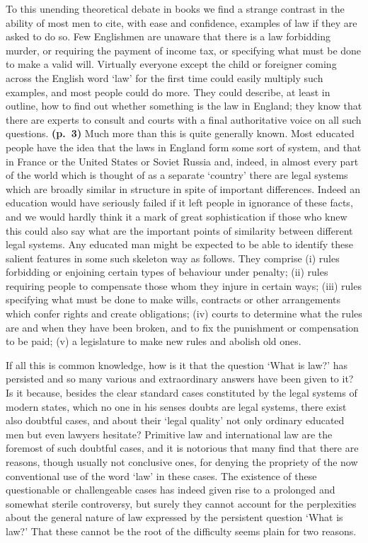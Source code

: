 \documentclass[12pt,oneside]{book}  %
\begin{document}
To this unending theoretical debate in books we find a strange contrast
in the ability of most men to cite, with ease and confidence, examples
of law if they are asked to do so. Few Englishmen are unaware that there
is a law forbidding murder, or requiring the payment of income tax, or
specifying what must be done to make a valid will. Virtually everyone
except the child or foreigner coming across the English word `law' for
the first time could easily multiply such examples, and most people
could do more. They could describe, at least in outline, how to find out
whether something is the law in England; they know that there are
experts to consult and courts with a final authoritative voice on all
such questions. \textbf{(p.~3)} Much more than this is quite generally
known. Most educated people have the idea that the laws in England form
some sort of system, and that in France or the United States or Soviet
Russia and, indeed, in almost every part of the world which is thought
of as a separate `country' there are legal systems which are broadly
similar in structure in spite of important differences. Indeed an
education would have seriously failed if it left people in ignorance of
these facts, and we would hardly think it a mark of great sophistication
if those who knew this could also say what are the important points of
similarity between different legal systems. Any educated man might be
expected to be able to identify these salient features in some such
skeleton way as follows. They comprise (i) rules forbidding or enjoining
certain types of behaviour under penalty; (ii) rules requiring people to
compensate those whom they injure in certain ways; (iii) rules
specifying what must be done to make wills, contracts or other
arrangements which confer rights and create obligations; (iv) courts to
determine what the rules are and when they have been broken, and to fix
the punishment or compensation to be paid; (v) a legislature to make new
rules and abolish old ones.

If all this is common knowledge, how is it that the question `What is
law?' has persisted and so many various and extraordinary answers have
been given to it? Is it because, besides the clear standard cases
constituted by the legal systems of modern states, which no one in his
senses doubts are legal systems, there exist also doubtful cases, and
about their `legal quality' not only ordinary educated men but even
lawyers hesitate? Primitive law and international law are the foremost
of such doubtful cases, and it is notorious that many find that there
are reasons, though usually not conclusive ones, for denying the
propriety of the now conventional use of the word `law' in these cases.
The existence of these questionable or challengeable cases has indeed
given rise to a prolonged and somewhat sterile controversy, but surely
they cannot account for the perplexities about the general nature of law
expressed by the persistent question `What is law?' That these cannot be
the root of the difficulty seems plain for two reasons.
\end{document}
